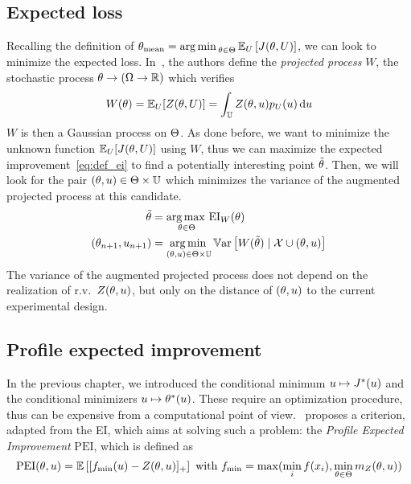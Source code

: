 \documentclass[../../Main_ManuscritThese.tex]{subfiles}
\begin{document}
\subsection{Expected loss}
\label{ssec:expected_loss_GP_projection}
Recalling the definition of ${\theta}_{\mathrm{mean}} = \operatorname*{arg\,min \,}_{\theta \in \Theta} \mathbb{E}_{U}\left[J(\theta, U)\right]$, we can look to minimize the expected loss. 
In~\cite{janusevskis_simultaneous_2010}, the authors define the \emph{projected process} $W$, the stochastic process $\theta \rightarrow \left(\Omega \rightarrow \mathbb{R}\right)$ which verifies
\begin{equation}
  W(\theta) = \mathbb{E}_U[Z(\theta, U)] = \int_{\mathbb{U}} Z(\theta, u) p_{U}(u)\,\mathrm{d}u
\end{equation}
$W$ is then a Gaussian process on $\Theta$. As done before, we want to minimize the unknown function $\mathbb{E}_U[J(\theta, U)]$ using $W$, thus we can maximize the expected improvement~\cref{eq:def_ei} to find a potentially interesting point $\tilde{\theta}$.
Then, we will look for the pair $(\theta, u) \in \Theta\times \mathbb{U}$ which minimizes the variance of the augmented projected process at this candidate.
\begin{align}
  \tilde{\theta} &= \operatorname*{arg\,max \,}_{\theta \in \Theta} \mathrm{EI}_W(\theta) \\
  (\theta_{n+1}, u_{n+1}) &= \operatorname*{arg\,min \,}_{(\theta, u)\in\Theta\times \mathbb{U}} \mathbb{V}\mathrm{ar}\left[W(\tilde{\theta}) \mid \mathcal{X} \cup (\theta,u) \right]
\end{align}
The variance of the augmented projected process does not depend on the realization of r.v.\ $Z(\theta, u)$, but only on the distance of $(\theta, u)$ to the current experimental design.
\subsection{Profile expected improvement}
In the previous chapter, we introduced the conditional minimum $u\mapsto J^*(u)$ and the conditional minimizers $u \mapsto \theta^*(u)$. These require an optimization procedure, thus can be expensive from a computational point of view.~\cite{ginsbourger_bayesian_2014} proposes a criterion, adapted from the EI, which aims at solving such a problem: the \emph{Profile Expected Improvement} $\mathrm{PEI}$, which is defined as
\begin{equation}
  \label{eq:def_PEI}
  \mathrm{PEI}(\theta, u)= \mathbb{E}\left[[f_{\min}(u) - Z(\theta, u)]_+\right] \text{ with } f_{\min} = \max(\min_i f(x_i), \min_{\theta \in \Theta} m_Z(\theta, u))
\end{equation}
\end{document}
